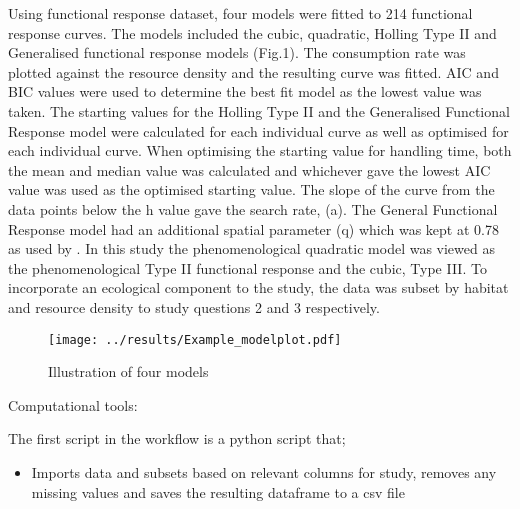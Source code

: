 \documentclass[11pt]{article}
\begin{document}
Using \cite{Pawar2012} functional response dataset, four models were fitted to 214 functional response curves. The models included the cubic, quadratic, Holling Type II and Generalised functional response models (Fig.1). The consumption rate was plotted against the resource density and the resulting curve was fitted. AIC and BIC values were used to determine the best fit model as the lowest value was taken.
The starting values for the Holling Type II and the Generalised Functional Response model were calculated for each individual curve as well as optimised for each individual curve. When optimising the starting value for handling time, both the mean and median value was calculated and whichever gave the lowest AIC value was used as the optimised starting value. The slope of the curve from the data points below the h value gave the search rate, (a). The General Functional Response model had an additional spatial parameter (q) which was kept at 0.78 as used by \cite{Pawar2012}. In this study the phenomenological quadratic model was viewed as the phenomenological Type II functional response and the cubic, Type III. 
To incorporate an ecological component to the study, the data was subset by habitat and resource density to study questions 2 and 3 respectively. \newline

\begin{figure}[h!]
	\centering 
	\texttt{[image: ../results/Example\_modelplot.pdf]}
	\caption{Illustration of four models}
	\label{Four models plotted}
\end{figure}



Computational tools: \newline



The first script in the workflow is a python script that;
	\begin{itemize}
	\item Imports data and subsets based on relevant columns for study, removes any missing values and saves the resulting dataframe to a csv file 
	\end{itemize}
\end{document}
